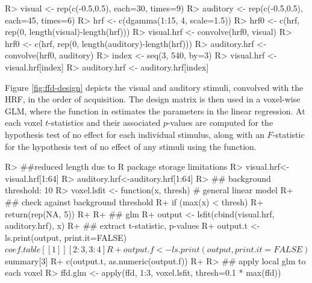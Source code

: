\documentclass[
]{article}
\begin{document}
\begin{CodeChunk}

\begin{CodeInput}
R> visual <- rep(c(-0.5,0.5), each=30, times=9)
R> auditory <- rep(c(-0.5,0.5), each=45, times=6)
R> hrf <- c(dgamma(1:15, 4, scale=1.5))
R> hrf0 <- c(hrf, rep(0, length(visual)-length(hrf)))
R> visual.hrf <- convolve(hrf0, visual)
R> hrf0 <- c(hrf, rep(0, length(auditory)-length(hrf)))
R> auditory.hrf <- convolve(hrf0, auditory)
R> index <- seq(3, 540, by=3)
R> visual.hrf <- visual.hrf[index]
R> auditory.hrf <- auditory.hrf[index]
\end{CodeInput}
\end{CodeChunk}

Figure \ref{fig:ffd-design} depicts the visual and auditory stimuli,
convolved with the HRF, in the order of acquisition. The design matrix
is then used in a voxel-wise GLM, where the  function in
 estimates the parameters in the linear regression. At each
voxel \(t\)-statistics and their associated \(p\)-values are computed
for the hypothesis test of no effect for each individual stimulus, along
with an \(F\)-statistic for the hypothesis test of no effect of any
stimuli using the  function.

\begin{CodeChunk}

\begin{CodeInput}
R> ##reduced length due to R package storage limitations
R> visual.hrf<-visual.hrf[1:64]
R> auditory.hrf<-auditory.hrf[1:64]
R> ## background threshold: 10%
R> voxel.lsfit <- function(x, thresh) { # general linear model
R+   ## check against background threshold
R+   if (max(x) < thresh) {
R+     return(rep(NA, 5))
R+   }
R+   ## glm
R+   output <- lsfit(cbind(visual.hrf, auditory.hrf), x)
R+   ## extract t-statistic, p-values
R+   output.t <- ls.print(output, print.it=FALSE)$coef.table[[1]][2:3,3:4]
R+   output.f <- ls.print(output, print.it=FALSE)$summary[3]
R+   c(output.t, as.numeric(output.f))
R+ }
R> ## apply local glm to each voxel
R> ffd.glm <- apply(ffd, 1:3, voxel.lsfit, thresh=0.1 * max(ffd))
\end{CodeInput}
\end{CodeChunk}
\end{document}
